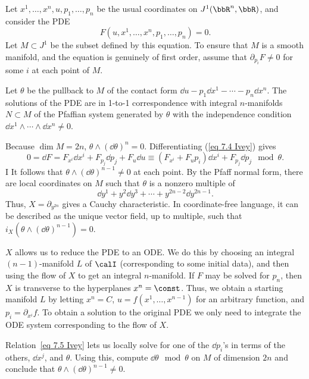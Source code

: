 \begin{example}
    Let $x^1,\ldots,x^n,u,p_1,\ldots,p_n$ be the usual coordinates on $J^1(\bbR^n,\bbR)$, and consider the PDE 
    \[F(u,x^1,\ldots,x^n,p_1,\ldots,p_n)=0.\label{eq 7.4 Ivey}\]
    Let $M\subset  J^1$ be the subset defined by this equation. To ensure that $M$ is a smooth manifold, and the equation is genuinely of first order, assume that $\partial_{p_i}F\neq 0$ for some $i$ at each point of $M$.

    Let $\theta$ be the pullback to $M$ of the contact form $\dd u-p_1\dd x^1-\cdots-p_n\dd x^n$. The solutions of the PDE are in 1-to-1 correspondence with integral $n$-manifolds $N\subset M$ of the Pfaffian system generated by $\theta$ with the independence condition $\dd x^1\wedge \cdots\wedge\dd x^n\neq 0$.

    Because $\dim M=2n$, $\theta\wedge (\dd\theta)^n=0$. Differentiating (\ref{eq 7.4 Ivey}) gives 
    \[0=\dd F=F_{x^i}\dd x^i+F_{p_j}\dd p_j+F_u\dd u\equiv (F_{x^i}+F_up_i)\dd x^i+F_{p_j}\dd p_j\mod\theta.\]I
    It follows that $\theta\wedge (\dd\theta)^{n-1}\neq 0$ at each point. By the Pfaff normal form, there are local coordinates on $M$ such that $\theta$ is a nonzero multiple of 
    \[\dd y^1+y^2\dd y^3+\cdots +y^{2n-2}\dd y^{2n-1}.\label{eq 7.5 Ivey}\]
    Thus, $X=\partial_{y^{2n}}$ gives a Cauchy characteristic. In coordinate-free language, it can be described as the unique vector field, up to multiple, such that $i_X(\theta\wedge(\dd\theta)^{n-1})=0$.

    $X$ allows us to reduce the PDE to an ODE. We do this by choosing an integral $(n-1)$-manifold $L$ of $\calI$ (corresponding to some initial data), and then using the flow of $X$ to get an integral $n$-manifold. If $F$ may be solved for $p_n$, then $X$ is transverse to the hyperplanes $x^n=\const$. Thus, we obtain a starting manifold $L$ by letting $x^n=C$, $u=f(x^1,\ldots,x^{n-1})$ for an arbitrary function, and $p_i=\partial_{x^i}f$. To obtain a solution to the original PDE we only need to integrate the ODE system corresponding to the flow of $X$.
\end{example}

\begin{xca}
    Relation~\ref{eq 7.5 Ivey} lets us locally solve for one of the $\dd p_i$'s in terms of the others, $\dd x^j$, and $\theta$. Using this, compute $\dd\theta\mod \theta$ on $M$ of dimension $2n$ and conclude that $\theta\wedge(\dd\theta)^{n-1}\neq 0$.
\end{xca}


